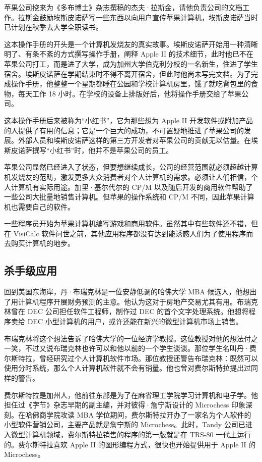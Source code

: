 \documentclass[12pt,UTF8]{ctexbook}
\begin{document}
苹果公司挖来为《多布博士》杂志撰稿的杰夫·拉斯金，请他负责公司的文档工作。拉斯金鼓励埃斯皮诺萨写一些东西以向用户宣传苹果计算机，埃斯皮诺萨当时已计划在秋季去大学全职读书。

这本操作手册的开头是一个计算机发烧友的真实故事。埃斯皮诺萨开始用一种清晰明了、有条不紊的方式撰写操作手册，阐释 Apple II 的技术细节，此时他已不在苹果公司打工，而是进了大学，成为加州大学伯克利分校的一名新生，住进了学生宿舍。埃斯皮诺萨在学期结束时不得不离开宿舍，但此时他尚未写完文档。为了完成操作手册，他整整一个星期都睡在公园和学校计算机房里，饿了就吃背包里的食物，每天工作 18 小时。在学校的设备上排版好后，他将操作手册交给了苹果公司。

这本操作手册后来被称为“小红书”，它为那些想为 Apple II 开发软件或附加产品的人提供了有用的信息；它是一个巨大的成功，不可置疑地推进了苹果公司的发展。外部人员和埃斯皮诺萨这样的第三方开发者对苹果公司的贡献无以估量。在埃斯皮诺萨撰写“小红书”时，他并不是苹果公司的员工。

苹果公司显然已经进入了状态，但要想继续成长，公司的经营范围就必须超越计算机发烧友的范畴，激发更多大众消费者对个人计算机的需求。必须让人们相信，个人计算机有实际用途。加里·基尔代尔的 CP/M 以及随后开发的商用软件帮助了一些公司大批量地销售计算机。但苹果的操作系统和 CP/M 不同，因此苹果计算机也需要自己的软件。

一些程序员开始为苹果计算机编写游戏和商用软件。虽然其中有些软件还不错，但在 VisiCalc 软件问世之前，其他应用程序都没有达到能诱惑人们为了使用程序而去购买计算机的地步。





\subsection{杀手级应用}


回到美国东海岸，丹·布瑞克林是一位安静低调的哈佛大学 MBA 候选人，他想出了用计算机程序开展财务预测的主意。他认为这对于房地产交易尤其有用。布瑞克林曾在 DEC 公司担任软件工程师，制作过 DEC 的首个文字处理系统。他想将程序卖给 DEC 小型计算机的用户，或许还能在新兴的微型计算机市场上销售。

布瑞克林将这个想法告诉了哈佛大学的一位经济学教授。这位教授对他的想法付之一笑，不过又说布瑞克林也许可以和他以前的一个学生谈谈。那位学生名叫丹·费尔斯特拉，曾经研究过个人计算机软件市场。那位教授还警告布瑞克林：既然可以使用分时系统，那么个人计算机软件就不会有销量。他也曾对费尔斯特拉提出过同样的警告。

费尔斯特拉是加州人，他前往东部是为了在麻省理工学院学习计算机和电子学。他担任过《字节》杂志早期的副主编，并对彼得·詹宁斯设计的 Microchess 印象深刻。在哈佛商学院攻读 MBA 学位期间，费尔斯特拉开办了一家名为个人软件的小型软件营销公司，主要产品就是詹宁斯的 Microchess。此时，Tandy 公司已进入微型计算机领域，费尔斯特拉销售的程序的第一版就是在 TRS-80 一代上运行的。费尔斯特拉喜欢 Apple II 的图形编程方式，很快也开始提供用于 Apple II 的 Microchess。
\end{document}
